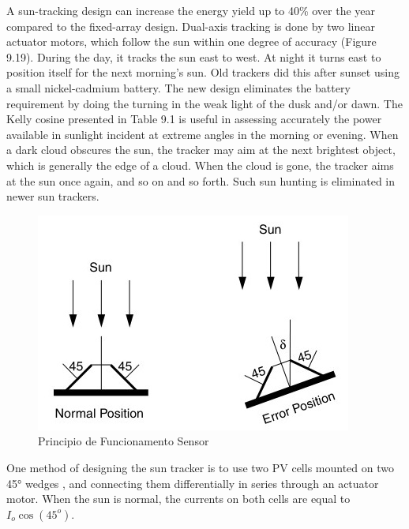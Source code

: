A sun-tracking design can increase the energy yield up to 40\% over the year compared to the fixed-array design. Dual-axis tracking is done by two linear actuator motors, which follow the sun within one degree of accuracy (Figure 9.19). During the day, it tracks the sun east to west. At night it turns east to position itself for the next morning’s sun. Old trackers did this after sunset using a small nickel-cadmium battery. The new design eliminates the battery requirement by doing the turning in the weak light of the dusk and/or dawn. The Kelly cosine presented in Table 9.1 is useful in assessing accurately the power available in sunlight incident at extreme angles in the morning or evening. When a dark cloud obscures the sun, the tracker may aim at the next brightest object, which is generally the edge of a cloud. When the cloud is gone, the tracker aims at the sun once again, and so on and so forth. Such sun hunting is eliminated in newer sun trackers. \cite{book_2}\\

\newpage

\begin{figure}[H]
\centering
\includegraphics[scale=0.52]{./image/Sensor_Actuator_Principle.jpg}
\caption{Principio de Funcionamento Sensor \cite{book_2}}
\end{figure}

One method of designing the sun tracker is to use two PV cells mounted on two 45° wedges , and connecting them differentially in series through an actuator motor. When the sun is normal, the currents on both cells are equal to $I_o \cos (45^o)$. \\

